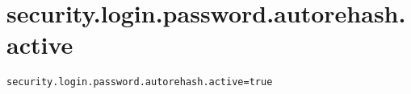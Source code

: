 \section{security.login.password.autorehash.active}
\label{configuration:SecurityLoginPasswordAutorehashActive}
\AvailableInJavaOnly{\TODO}
\begin{lstlisting}[style=Props,caption={Usage example for \textit{security.login.password.autorehash.active}}]
security.login.password.autorehash.active=true
\end{lstlisting}